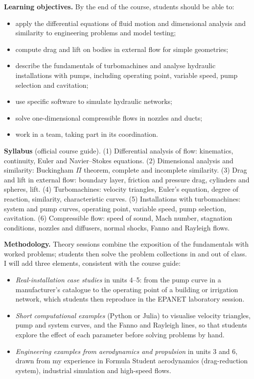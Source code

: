 \documentclass[11pt]{article}
\begin{document}
\textbf{Learning objectives.} By the end of the course, students should be able to:
\begin{itemize}
\item apply the differential equations of fluid motion and dimensional analysis and
similarity to engineering problems and model testing;
\item compute drag and lift on bodies in external flow for simple geometries;
\item describe the fundamentals of turbomachines and analyse hydraulic installations with
pumps, including operating point, variable speed, pump selection and cavitation;
\item use specific software to simulate hydraulic networks;
\item solve one-dimensional compressible flows in nozzles and ducts;
\item work in a team, taking part in its coordination.
\end{itemize}

\textbf{Syllabus} (official course guide).
(1) Differential analysis of flow: kinematics, continuity, Euler and Navier--Stokes equations.
(2) Dimensional analysis and similarity: Buckingham $\Pi$ theorem, complete and incomplete similarity.
(3) Drag and lift in external flow: boundary layer, friction and pressure drag, cylinders and spheres, lift.
(4) Turbomachines: velocity triangles, Euler's equation, degree of reaction, similarity, characteristic curves.
(5) Installations with turbomachines: system and pump curves, operating point, variable speed, pump selection, cavitation.
(6) Compressible flow: speed of sound, Mach number, stagnation conditions, nozzles and diffusers, normal shocks, Fanno and Rayleigh flows.

\textbf{Methodology.} Theory sessions combine the exposition of the fundamentals with
worked problems; students then solve the problem collections in and out of class. I will
add three elements, consistent with the course guide:
\begin{itemize}
\item \emph{Real-installation case studies} in units 4--5: from the pump curve in a
manufacturer's catalogue to the operating point of a building or irrigation network, which
students then reproduce in the EPANET laboratory session.
\item \emph{Short computational examples} (Python or Julia) to visualise velocity triangles,
pump and system curves, and the Fanno and Rayleigh lines, so that students explore the
effect of each parameter before solving problems by hand.
\item \emph{Engineering examples from aerodynamics and propulsion} in units 3 and 6, drawn
from my experience in Formula Student aerodynamics (drag-reduction system), industrial
simulation and high-speed flows.
\end{itemize}
\end{document}
